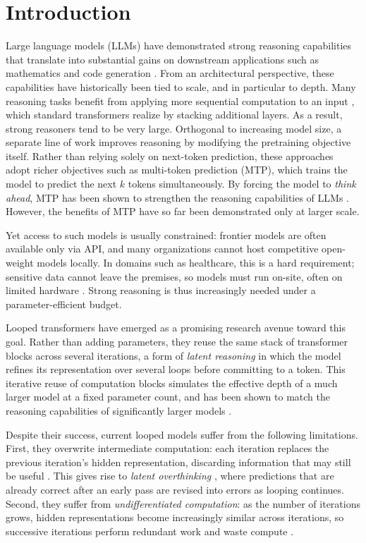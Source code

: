 \section{Introduction}




Large language models (LLMs) have demonstrated strong reasoning capabilities that translate into substantial gains on downstream applications such as mathematics and code generation \cite{guo2025deepseek, shao2024deepseekmath}. From an architectural perspective, these capabilities have historically been tied to scale, and in particular to depth. Many reasoning tasks benefit from applying more sequential computation to an input \cite{saunshi2025reasoning}, which standard transformers realize by stacking additional layers. As a result, strong reasoners tend to be very large.
Orthogonal to increasing model size, a separate line of work improves reasoning by modifying the pretraining objective itself. Rather than relying solely on next-token prediction, these approaches adopt richer objectives such as multi-token prediction (MTP), which trains the model to predict the next $k$ tokens simultaneously. By forcing the model to \textit{think ahead}, MTP has been shown to strengthen the reasoning capabilities of LLMs \cite{liu2024deepseek, gloeckle2024better}. However, the benefits of MTP have so far been demonstrated only at larger scale.

Yet access to such models is usually constrained: frontier models are often available only via API, and many organizations 
cannot host
competitive open-weight models locally. In domains such as healthcare, this is a hard requirement; sensitive data cannot leave the premises, so models must run on-site, often on limited hardware \cite{garg2026rise}. Strong reasoning is thus increasingly needed under a parameter-efficient budget.

Looped transformers have emerged as a promising research avenue toward this goal. Rather than adding parameters, they reuse the same stack of transformer blocks across several iterations, a form of \textit{latent reasoning} in which the model refines its representation over several loops before committing to a token. This iterative reuse of computation blocks simulates the effective depth of a much larger model at a fixed parameter count, and has been shown to match the reasoning capabilities of significantly larger models \cite{fu2026simply}.

Despite their success, current looped models suffer from the following limitations. First, they overwrite intermediate computation: each iteration replaces the previous iteration's hidden representation, discarding information that may still be useful \cite{jeddi2026loopformer, zhu2025scaling}. This gives rise to \textit{latent overthinking} \cite{fu2025think}, where predictions that are already correct after an early pass are revised into errors as looping continues. Second, they suffer from \textit{undifferentiated computation}: as the number of iterations grows, hidden representations become increasingly similar across iterations, so successive iterations perform redundant work and waste compute \cite{yu2025mesh}.

